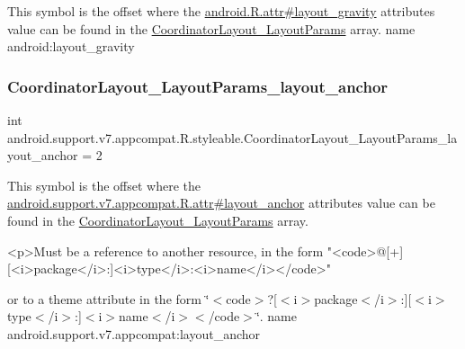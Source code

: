 This symbol is the offset where the \hyperlink{}{android.\+R.\+attr\#layout\+\_\+gravity} attribute\textquotesingle{}s value can be found in the \hyperlink{classandroid_1_1support_1_1v7_1_1appcompat_1_1R_1_1styleable_aa327c121de57ab2e57c054fff5f5c980}{Coordinator\+Layout\+\_\+\+Layout\+Params} array.  name android\+:layout\+\_\+gravity \mbox{\label{classandroid_1_1support_1_1v7_1_1appcompat_1_1R_1_1styleable_a0326fdc342fc459e0f22e865f9bafa9b}} 
\subsubsection{\texorpdfstring{Coordinator\+Layout\+\_\+\+Layout\+Params\+\_\+layout\+\_\+anchor}{CoordinatorLayout\_LayoutParams\_layout\_anchor}}
{\footnotesize\ttfamily int android.\+support.\+v7.\+appcompat.\+R.\+styleable.\+Coordinator\+Layout\+\_\+\+Layout\+Params\+\_\+layout\+\_\+anchor = 2\hspace{0.3cm}{\ttfamily [static]}}

This symbol is the offset where the \hyperlink{classandroid_1_1support_1_1v7_1_1appcompat_1_1R_1_1attr_a394f8b20bd8121817fc5d993a0236314}{android.\+support.\+v7.\+appcompat.\+R.\+attr\#layout\+\_\+anchor} attribute\textquotesingle{}s value can be found in the \hyperlink{classandroid_1_1support_1_1v7_1_1appcompat_1_1R_1_1styleable_aa327c121de57ab2e57c054fff5f5c980}{Coordinator\+Layout\+\_\+\+Layout\+Params} array.

\begin{DoxyVerb}      <p>Must be a reference to another resource, in the form "<code>@[+][<i>package</i>:]<i>type</i>:<i>name</i></code>"
\end{DoxyVerb}
 or to a theme attribute in the form \char`\"{}$<$code$>$?\mbox{[}$<$i$>$package$<$/i$>$\+:\mbox{]}\mbox{[}$<$i$>$type$<$/i$>$\+:\mbox{]}$<$i$>$name$<$/i$>$$<$/code$>$\char`\"{}.  name android.\+support.\+v7.\+appcompat\+:layout\+\_\+anchor \mbox{\label{classandroid_1_1support_1_1v7_1_1appcompat_1_1R_1_1styleable_ac5930c177fccf3156cc93d585d9e2e9c}} 
